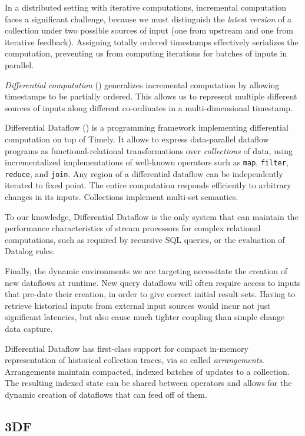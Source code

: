 \documentclass[../index.tex]{subfiles}
\begin{document}
In a distributed setting with iterative computations, incremental
computation faces a significant challenge, because we must distinguish
the \emph{latest version} of a collection under two possible sources
of input (one from upstream and one from iterative
feedback). Assigning totally ordered timestamps effectively serializes
the computation, preventing us from computing iterations for batches
of inputs in parallel.

\emph{Differential computation} (\cite{mcsherry2013differential})
generalizes incremental computation by allowing timestamps to be
partially ordered. This allows us to represent multiple different
sources of inputs along different co-ordinates in a multi-dimensional
timestamp.

Differential Dataflow (\cite{differential}) is a programming framework
implementing differential computation on top of Timely. It allows to
express data-parallel dataflow programs as functional-relational
transformations over \emph{collections} of data, using incrementalized
implementations of well-known operators such as \texttt{map},
\texttt{filter}, \texttt{reduce}, and \texttt{join}. Any region of a
differential dataflow can be independently iterated to fixed
point. The entire computation responds efficiently to arbitrary
changes in its inputs. Collections implement multi-set semantics.

To our knowledge, Differential Dataflow is the only system that can
maintain the performance characteristics of stream processors for
complex relational computations, such as required by recursive SQL
queries, or the evaluation of Datalog rules.

Finally, the dynamic environments we are targeting necessitate the
creation of new dataflows at runtime. New query dataflows will often
require access to inputs that pre-date their creation, in order to
give correct initial result sets. Having to retrieve historical inputs
from external input sources would incur not just significant
latencies, but also cause much tighter coupling than simple change
data capture.

Differential Dataflow has first-class support for compact in-memory
representation of historical collection traces, via so called
\emph{arrangements}. Arrangements maintain compacted, indexed batches
of updates to a collection. The resulting indexed state can be shared
between operators and allows for the dynamic creation of dataflows
that can feed off of them.

\subsection{3DF}
\end{document}
